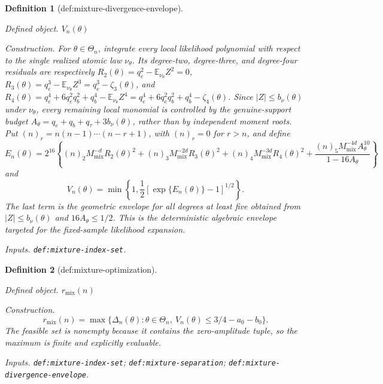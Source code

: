 \documentclass{article}
\newtheorem{definition}{Definition}
\begin{document}
\begin{definition}[def:mixture-divergence-envelope]\label{def:mixture-divergence-envelope}
\par\smallskip\noindent\emph{Defined object.} \(V_n(\theta)\)
\par\smallskip\noindent\emph{Construction.} For \(\theta\in\Theta_n\), integrate every local likelihood polynomial with respect to the single realized atomic law \(\nu_\theta\). Its degree-two, degree-three, and degree-four residuals are respectively \(R_2(\theta)=q_e^2-\mathbb E_{\nu_\theta}Z^2=0\), \(R_3(\theta)=q_e^3-\mathbb E_{\nu_\theta}Z^3=q_e^3-\zeta_3(\theta)\), and \(R_4(\theta)=q_e^4+6q_e^2q_b^2+q_b^4-\mathbb E_{\nu_\theta}Z^4=q_e^4+6q_e^2q_b^2+q_b^4-\zeta_4(\theta)\). Since \(|Z|\le b_\nu(\theta)\) under \(\nu_\theta\), every remaining local monomial is controlled by the genuine-support budget \(A_\theta=q_e+q_b+q_\tau+3b_\nu(\theta)\), rather than by independent moment roots. Put \((n)_r=n(n-1)\cdots(n-r+1)\), with \((n)_r=0\) for \(r>n\), and define \[E_n(\theta)=2^{16}\left\{(n)_2M_{\mathrm{mix}}^{-d}R_2(\theta)^2+(n)_3M_{\mathrm{mix}}^{-2d}R_3(\theta)^2+(n)_4M_{\mathrm{mix}}^{-3d}R_4(\theta)^2+\frac{(n)_5M_{\mathrm{mix}}^{-4d}A_\theta^{10}}{1-16A_\theta}\right\}\] and \[V_n(\theta)=\min\left\{1,\frac12\left[\exp\{E_n(\theta)\}-1\right]^{1/2}\right\}.\] The last term is the geometric envelope for all degrees at least five obtained from \(|Z|\le b_\nu(\theta)\) and \(16A_\theta\le1/2\). This is the deterministic algebraic envelope targeted for the fixed-sample likelihood expansion.
\par\smallskip\noindent\emph{Inputs.} \texttt{def:\allowbreak{}mixture-\allowbreak{}index-\allowbreak{}set}.
\end{definition}

\begin{definition}[def:mixture-optimization]\label{def:mixture-optimization}
\par\smallskip\noindent\emph{Defined object.} \(r_{\mathrm{mix}}(n)\)
\par\smallskip\noindent\emph{Construction.} \[r_{\mathrm{mix}}(n)=\max\{\Delta_n(\theta):\theta\in\Theta_n,\ V_n(\theta)\le3/4-a_0-b_0\}.\] The feasible set is nonempty because it contains the zero-amplitude tuple, so the maximum is finite and explicitly evaluable.
\par\smallskip\noindent\emph{Inputs.} \texttt{def:\allowbreak{}mixture-\allowbreak{}index-\allowbreak{}set}; \texttt{def:\allowbreak{}mixture-\allowbreak{}separation}; \texttt{def:\allowbreak{}mixture-\allowbreak{}divergence-\allowbreak{}envelope}.
\end{definition}
\end{document}
